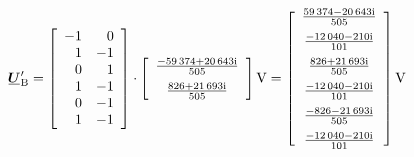\begin{exemple}
	\[
	\mcmplx{U}'\ped{B} =
	\begin{bmatrix}\begin{array}{rr} 
			-1 & 0 \\ 1  & -1 \\  0 & 1 \\ 1 & -1 \\ 0 & -1 \\ 1 & -1
	\end{array}\end{bmatrix} \cdot
	\begin{bmatrix}\begin{array}{c}
			\frac{\complexnum{-59374+j20643}}{505} \\[2mm]
			\frac{\complexnum{826+j21693}}{505}
	\end{array}\end{bmatrix}\unit{V} =
	\begin{bmatrix}\begin{array}{c}
			\frac{\complexnum{ 59374 - j 20643}}{505} \\[2mm]
			\frac{\complexnum{-12040 - j 210}}{101}  \\[2mm]
			\frac{\complexnum{826 + j 21693}}{505} \\[2mm]
			\frac{\complexnum{ -12040 - j 210}}{101}  \\[2mm]
			\frac{\complexnum{ -826 - j 21693}}{505} \\[2mm]
			\frac{\complexnum{ -12040 - j 210}}{101}
	\end{array}\end{bmatrix}\unit{V}
	\]
		

\end{exemple}
